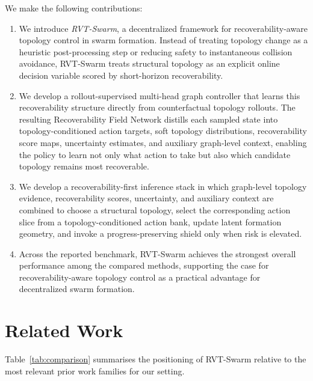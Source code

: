 \documentclass{ieeeaccess}
\begin{document}
We make the following contributions:
\begin{enumerate}
    \item We introduce \emph{RVT-Swarm}, a decentralized framework for recoverability-aware topology control in swarm formation. Instead of treating topology change as a heuristic post-processing step or reducing safety to instantaneous collision avoidance, RVT-Swarm treats structural topology as an explicit online decision variable scored by short-horizon recoverability.

    \item We develop a rollout-supervised multi-head graph controller that learns this recoverability structure directly from counterfactual topology rollouts. The resulting Recoverability Field Network distills each sampled state into topology-conditioned action targets, soft topology distributions, recoverability score maps, uncertainty estimates, and auxiliary graph-level context, enabling the policy to learn not only what action to take but also which candidate topology remains most recoverable.

    \item We develop a recoverability-first inference stack in which graph-level topology evidence, recoverability scores, uncertainty, and auxiliary context are combined to choose a structural topology, select the corresponding action slice from a topology-conditioned action bank, update latent formation geometry, and invoke a progress-preserving shield only when risk is elevated.

    \item Across the reported benchmark, RVT-Swarm achieves the strongest overall performance among the compared methods, supporting the case for recoverability-aware topology control as a practical advantage for decentralized swarm formation.
\end{enumerate}

\section{Related Work}
\label{sec:related}

Table~\ref{tab:comparison} summarises the positioning of RVT-Swarm relative to the most relevant prior work families for our setting.
\end{document}
